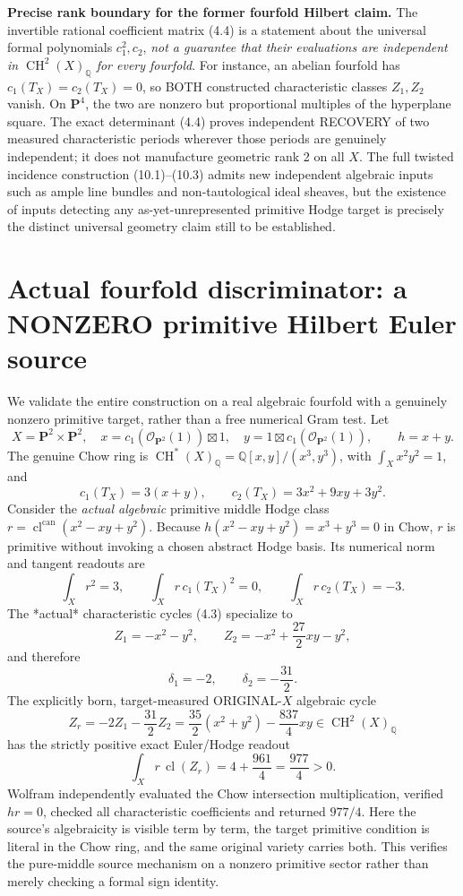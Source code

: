 \documentclass[11pt]{article}
\newcommand{\Q}{\mathbb Q}
\newcommand{\CH}{\operatorname{CH}}
\newcommand{\cl}{\operatorname{cl}}
\begin{document}
\noindent\textbf{Precise rank boundary for the former fourfold
Hilbert claim.}
The invertible rational coefficient matrix (4.4)
is a statement about the universal formal
polynomials \(c_1^2,c_2\), \emph{not a guarantee
that their evaluations are independent in
\(\CH^2(X)_\Q\) for every fourfold}.
For instance, an abelian fourfold has
\(c_1(T_X)=c_2(T_X)=0\),
so BOTH constructed characteristic classes
\(Z_1,Z_2\) vanish. On \(\mathbf P^4\),
the two are nonzero but proportional multiples
of the hyperplane square. The exact determinant
(4.4) proves independent RECOVERY of two
measured characteristic periods wherever
those periods are genuinely independent;
it does not manufacture geometric rank 2
on all \(X\). The full twisted incidence
construction (10.1)--(10.3) admits new
independent algebraic inputs such as ample
line bundles and non-tautological ideal sheaves,
but the existence of inputs detecting any
as-yet-unrepresented primitive Hodge target
is precisely the distinct universal
geometry claim still to be established.

\section{Actual fourfold discriminator: a NONZERO primitive Hilbert Euler source}
We validate the entire construction on a real algebraic fourfold
with a genuinely nonzero primitive target, rather than a free
numerical Gram test. Let
\[
 X=\mathbf P^2\times\mathbf P^2,\quad
 x=c_1(\mathcal O_{\mathbf P^2}(1))\boxtimes1,\quad
 y=1\boxtimes c_1(\mathcal O_{\mathbf P^2}(1)),
 \qquad h=x+y.
\]
The genuine Chow ring is
\(
 \CH^*(X)_\Q=\Q[x,y]/(x^3,y^3)
\),
with \(\int_X x^2y^2=1\), and
\[
 c_1(T_X)=3(x+y),\qquad
 c_2(T_X)=3x^2+9xy+3y^2.
                                                               \tag{13.1}
\]
Consider the \emph{actual algebraic} primitive middle
Hodge class
\(
 r=\cl^{\mathrm{can}}(x^2-xy+y^2)
\).
Because \(h(x^2-xy+y^2)=x^3+y^3=0\)
in Chow, \(r\) is primitive without invoking a
chosen abstract Hodge basis. Its numerical norm and
tangent readouts are
\[
 \int_Xr^2=3,\qquad
 \int_Xr\,c_1(T_X)^2=0,\qquad
 \int_Xr\,c_2(T_X)=-3.                              \tag{13.2}
\]
The *actual* characteristic cycles (4.3) specialize to
\[
 Z_1=-x^2-y^2,\qquad
 Z_2=-x^2+\frac{27}{2}xy-y^2,
                                                               \tag{13.3}
\]
and therefore
\[
 \delta_1=-2,\qquad \delta_2=-\frac{31}{2}.
\]
The explicitly born, target-measured ORIGINAL-\(X\)
algebraic cycle
\[
 \boxed{
 Z_r=-2 Z_1-\frac{31}{2}Z_2
    =\frac{35}{2}(x^2+y^2)-\frac{837}{4}xy
       \in\CH^2(X)_\Q
 }                                                      \tag{13.4}
\]
has the strictly positive exact Euler/Hodge readout
\[
 \boxed{\int_X r\,\cl(Z_r)
             =4+\frac{961}{4}=\frac{977}{4}>0.}   \tag{13.5}
\]
Wolfram independently evaluated the Chow intersection
multiplication, verified \(hr=0\), checked all
characteristic coefficients and returned \(977/4\).
Here the source's algebraicity is visible term by term,
the target primitive condition is literal in the Chow ring,
and the same original variety carries both.
This verifies the pure-middle source mechanism on a
nonzero primitive sector rather than merely checking
a formal sign identity.
\end{document}
